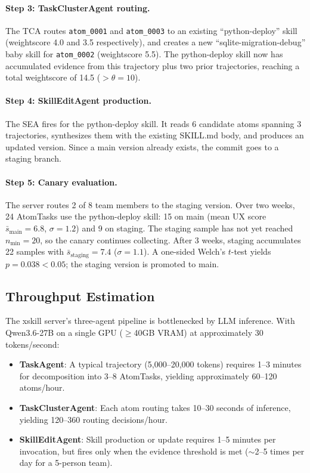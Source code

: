 \documentclass{article}
\begin{document}
\paragraph{Step 3: TaskClusterAgent routing.} The TCA routes \texttt{atom\_0001} and \texttt{atom\_0003} to an existing ``python-deploy'' skill (weightscore 4.0 and 3.5 respectively), and creates a new ``sqlite-migration-debug'' baby skill for \texttt{atom\_0002} (weightscore 5.5). The python-deploy skill now has accumulated evidence from this trajectory plus two prior trajectories, reaching a total weightscore of 14.5 ($> \theta = 10$).

\paragraph{Step 4: SkillEditAgent production.} The SEA fires for the python-deploy skill. It reads 6 candidate atoms spanning 3 trajectories, synthesizes them with the existing SKILL.md body, and produces an updated version. Since a main version already exists, the commit goes to a staging branch.

\paragraph{Step 5: Canary evaluation.} The server routes 2 of 8 team members to the staging version. Over two weeks, 24 AtomTasks use the python-deploy skill: 15 on main (mean UX score $\bar{s}_{\mathrm{main}} = 6.8$, $\sigma = 1.2$) and 9 on staging. The staging sample has not yet reached $n_{\min} = 20$, so the canary continues collecting. After 3 weeks, staging accumulates 22 samples with $\bar{s}_{\mathrm{staging}} = 7.4$ ($\sigma = 1.1$). A one-sided Welch's $t$-test yields $p = 0.038 < 0.05$; the staging version is promoted to main.

\subsection{Throughput Estimation}

The xskill server's three-agent pipeline is bottlenecked by LLM inference. With Qwen3.6-27B on a single GPU ($\geq$40GB VRAM) at approximately 30 tokens/second:
\begin{itemize}
    \item \textbf{TaskAgent}: A typical trajectory (5,000--20,000 tokens) requires 1--3 minutes for decomposition into 3--8 AtomTasks, yielding approximately 60--120 atoms/hour.
    \item \textbf{TaskClusterAgent}: Each atom routing takes 10--30 seconds of inference, yielding 120--360 routing decisions/hour.
    \item \textbf{SkillEditAgent}: Skill production or update requires 1--5 minutes per invocation, but fires only when the evidence threshold is met ($\sim$2--5 times per day for a 5-person team).
\end{itemize}
\end{document}

